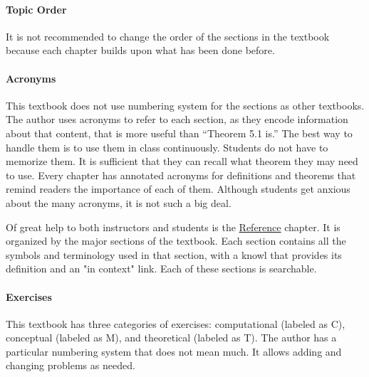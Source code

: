 \documentclass[10pt,]{article}
\begin{document}
\typeout{************************************************}
\typeout{************************************************}
\paragraph[{Topic Order}]{Topic Order}\hypertarget{paragraphs-11}{}
\hypertarget{p-28}{}%
It is not recommended to change the order of the sections in the textbook because each chapter builds upon what has been done before.%
\typeout{************************************************}
\typeout{************************************************}
\paragraph[{Acronyms}]{Acronyms}\hypertarget{paragraphs-12}{}
\hypertarget{p-29}{}%
This textbook does not use numbering system for the sections as other textbooks. The author uses acronyms to refer to each section, as they encode information about that content, that is more useful than “Theorem 5.1 is.” The best way to handle them is to use them in class continuously. Students do not have to memorize them. It is sufficient  that they can recall what theorem they may need to use. Every chapter has annotated acronyms for definitions and theorems that remind readers the importance of each of them. Although students get anxious about the many acronyms, it is not such a big deal.%
\par
\hypertarget{p-30}{}%
Of great help to both instructors and students is the \href{https://books.aimath.org/fcla/reference.html}{Reference} chapter. It is organized by the major sections of the textbook. Each section contains all the symbols and terminology used in that section, with a knowl that provides its definition and an "in context" link. Each of these sections is searchable.%
\typeout{************************************************}
\typeout{************************************************}
\paragraph[{Exercises}]{Exercises}\hypertarget{paragraphs-13}{}
\hypertarget{p-31}{}%
This textbook has three categories of exercises: computational (labeled as C), conceptual (labeled as M), and theoretical (labeled as T). The author has a particular numbering system that does not mean much. It allows adding and changing problems as needed.%
\typeout{************************************************}
\typeout{************************************************}
\end{document}
